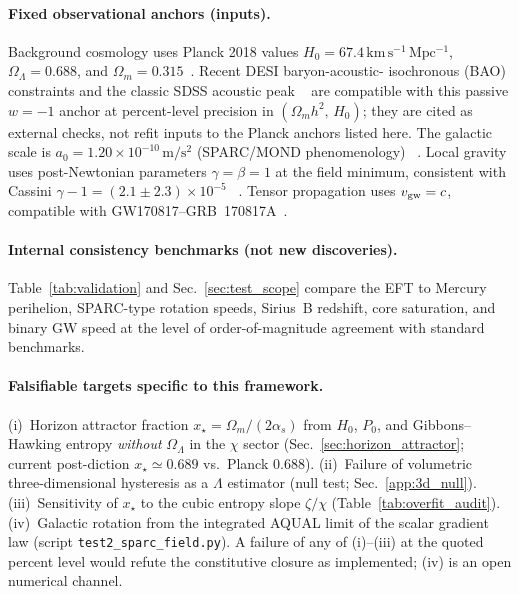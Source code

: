 \documentclass[prd,
               reprint,
               aps,
               preprintnumbers,
               nofootinbib,
               longbibliography,
               floatfix]{revtex4-2}
\begin{document}
\paragraph{Fixed observational anchors (inputs).}
Background cosmology uses Planck 2018 values
$H_0=67.4\,\mathrm{km\,s^{-1}\,Mpc^{-1}}$, $\Omega_\Lambda=0.688$,
and $\Omega_m=0.315$~\cite{Planck2020}. Recent DESI baryon-acoustic-%
isochronous (BAO) constraints and the classic SDSS acoustic peak%
~\cite{DESI2024,Eisenstein2005} are compatible with this passive
$w=-1$ anchor at percent-level precision in $(\Omega_m h^2,\,H_0)$;
they are cited as external checks, not refit inputs to the Planck
anchors listed here. The galactic scale is
$a_0=1.20\times10^{-10}\,\mathrm{m/s^2}$ (SPARC/MOND phenomenology)%
~\cite{Milgrom1983,Famaey2012,Sanders2002}. Local gravity
uses post-Newtonian parameters $\gamma=\beta=1$ at the field minimum,
consistent with Cassini $\gamma-1=(2.1\pm2.3)\times10^{-5}$%
~\cite{Will2014,Bertotti2003}. Tensor propagation uses $v_{\rm gw}=c$,
compatible with GW170817--GRB~170817A~\cite{Abbott2017GW}.

\paragraph{Internal consistency benchmarks (not new discoveries).}
Table~\ref{tab:validation} and Sec.~\ref{sec:test_scope} compare the
EFT to Mercury perihelion, SPARC-type rotation speeds, Sirius~B
redshift, core saturation, and binary GW speed at the level of
order-of-magnitude agreement with standard benchmarks.

\paragraph{Falsifiable targets specific to this framework.}
(i)~Horizon attractor fraction $x_\star=\Omega_m/(2\alpha_s)$ from
$H_0$, $P_0$, and Gibbons--Hawking entropy \emph{without}
$\Omega_\Lambda$ in the $\chi$ sector (Sec.~\ref{sec:horizon_attractor};
current post-diction $x_\star\simeq 0.689$ vs.\ Planck $0.688$).
(ii)~Failure of volumetric three-dimensional hysteresis as a
$\Lambda$ estimator (null test; Sec.~\ref{app:3d_null}).
(iii)~Sensitivity of $x_\star$ to the cubic entropy slope
$\zeta/\chi$ (Table~\ref{tab:overfit_audit}).
(iv)~Galactic rotation from the integrated AQUAL limit of the scalar
gradient law (script \texttt{test2\_sparc\_field.py}).
A failure of any of (i)--(iii) at the quoted percent level would refute
the constitutive closure as implemented; (iv) is an open numerical
channel.
\end{document}
